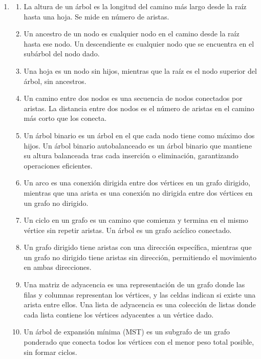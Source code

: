 \documentclass[12pt]{article}
\begin{document}
      \begin{enumerate}
        \item
          \begin{enumerate}[label=\alph*)]
            \item La altura de un árbol es la longitud del camino más largo desde la raíz hasta una hoja. Se mide en número de aristas.
            \item Un ancestro de un nodo es cualquier nodo en el camino desde la raíz hasta ese nodo. Un descendiente es cualquier nodo que se encuentra en el subárbol del nodo dado.
            \item Una hoja es un nodo sin hijos, mientras que la raíz es el nodo superior del árbol, sin ancestros.
            \item Un camino entre dos nodos es una secuencia de nodos conectados por aristas. La distancia entre dos nodos es el número de aristas en el camino más corto que los conecta.
            \item Un árbol binario es un árbol en el que cada nodo tiene como máximo dos hijos. Un árbol binario autobalanceado es un árbol binario que mantiene su altura balanceada tras cada inserción o eliminación, garantizando operaciones eficientes.
            \item Un arco es una conexión dirigida entre dos vértices en un grafo dirigido, mientras que una arista es una conexión no dirigida entre dos vértices en un grafo no dirigido.
            \item Un ciclo en un grafo es un camino que comienza y termina en el mismo vértice sin repetir aristas. Un árbol es un grafo acíclico conectado.
            \item Un grafo dirigido tiene aristas con una dirección específica, mientras que un grafo no dirigido tiene aristas sin dirección, permitiendo el movimiento en ambas direcciones.
            \item Una matriz de adyacencia es una representación de un grafo donde las filas y columnas representan los vértices, y las celdas indican si existe una arista entre ellos. Una lista de adyacencia es una colección de listas donde cada lista contiene los vértices adyacentes a un vértice dado.
            \item Un árbol de expansión mínima (MST) es un subgrafo de un grafo ponderado que conecta todos los vértices con el menor peso total posible, sin formar ciclos.
          \end{enumerate}


\end{enumerate}
\end{document}

